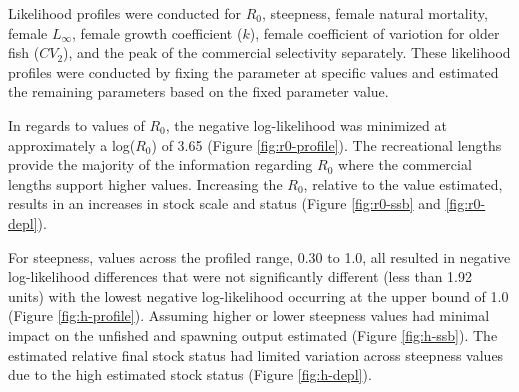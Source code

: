 \documentclass[11pt,
  english,
  a4paper,
]{article}
\begin{document}
\leavevmode\tagmcend\tagstructend


Likelihood profiles were conducted for {\(R_0\)\leavevmode\tagmcend\tagstructend}, steepness, female natural mortality, female {\(L_{\infty}\)\leavevmode\tagmcend\tagstructend}, female growth coefficient ({\(k\)\leavevmode\tagmcend\tagstructend}), female coefficient of variotion for older fish ({\(CV_2\)\leavevmode\tagmcend\tagstructend}), and the peak of the commercial selectivity separately. These likelihood profiles were conducted by fixing the parameter at specific values and estimated the remaining parameters based on the fixed parameter value.

\leavevmode\tagmcend\tagstructend\par


In regards to values of {\(R_0\)\leavevmode\tagmcend\tagstructend}, the negative log-likelihood was minimized at approximately a log({\(R_0\)\leavevmode\tagmcend\tagstructend}) of 3.65 (Figure \ref{fig:r0-profile}). The recreational lengths provide the majority of the information regarding {\(R_0\)\leavevmode\tagmcend\tagstructend} where the commercial lengths support higher values. Increasing the {\(R_0\)\leavevmode\tagmcend\tagstructend}, relative to the value estimated, results in an increases in stock scale and status (Figure \ref{fig:r0-ssb} and \ref{fig:r0-depl}).

\leavevmode\tagmcend\tagstructend\par


For steepness, values across the profiled range, 0.30 to 1.0, all resulted in negative log-likelihood differences that were not significantly different (less than 1.92 units) with the lowest negative log-likelihood occurring at the upper bound of 1.0 (Figure \ref{fig:h-profile}). Assuming higher or lower steepness values had minimal impact on the unfished and spawning output estimated (Figure \ref{fig:h-ssb}). The estimated relative final stock status had limited variation across steepness values due to the high estimated stock status (Figure \ref{fig:h-depl}).
\end{document}
